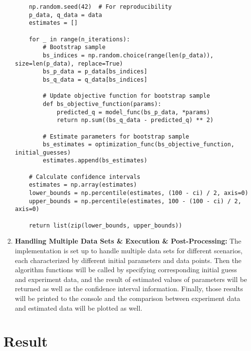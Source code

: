 \documentclass[12pt]{article} %
\begin{document}
\begin{enumerate}
\begin{lstlisting}
    np.random.seed(42)  # For reproducibility
    p_data, q_data = data
    estimates = []

    for _ in range(n_iterations):
        # Bootstrap sample
        bs_indices = np.random.choice(range(len(p_data)), size=len(p_data), replace=True)
        bs_p_data = p_data[bs_indices]
        bs_q_data = q_data[bs_indices]
        
        # Update objective function for bootstrap sample
        def bs_objective_function(params):
            predicted_q = model_func(bs_p_data, *params)
            return np.sum((bs_q_data - predicted_q) ** 2)
        
        # Estimate parameters for bootstrap sample
        bs_estimates = optimization_func(bs_objective_function, initial_guesses)
        estimates.append(bs_estimates)
    
    # Calculate confidence intervals
    estimates = np.array(estimates)
    lower_bounds = np.percentile(estimates, (100 - ci) / 2, axis=0)
    upper_bounds = np.percentile(estimates, 100 - (100 - ci) / 2, axis=0)
    
    return list(zip(lower_bounds, upper_bounds))
    \end{lstlisting}
    \item \textbf{Handling Multiple Data Sets \& Execution \& Post-Processing:}
    The implementation is set up to handle multiple data sets for different scenarios, each characterized by different initial parameters and data points. Then the algorithm functions will be called
    by specifying corresponding initial guess and experiment data, and the result of estimated values of parameters will be returned as well as the confidence interval information. Finally, those results will be 
    printed to the console and the comparison between experiment data and estimated data will be plotted as well.
\end{enumerate}

\section{Result}
\end{document}
